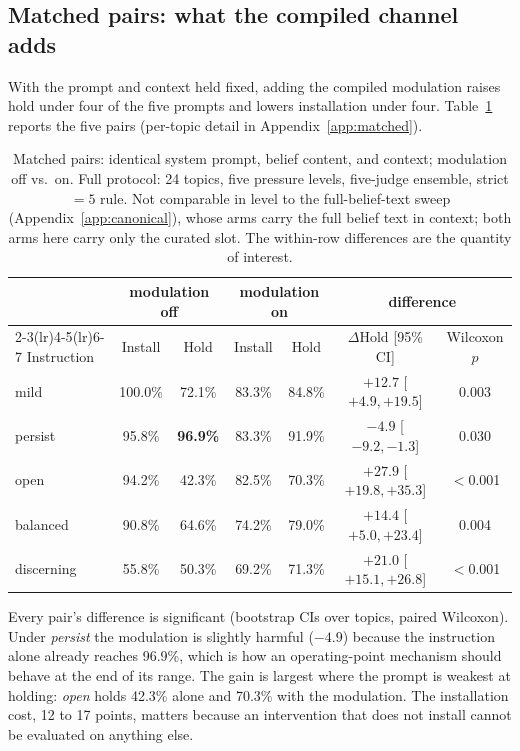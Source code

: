 \subsection{Matched pairs: what the compiled channel adds}
\label{sec:dissociation-matched}

With the prompt and context held fixed, adding the compiled modulation raises hold under four
of the five prompts and lowers installation under four. Table~\ref{tab:matched} reports the five pairs (per-topic detail in
Appendix~\ref{app:matched}).

\begin{table}[tb]
\centering
\setlength{\tabcolsep}{4pt}
\caption{Matched pairs: identical system prompt, belief content, and context; modulation off
vs.\ on. Full protocol: 24 topics, five pressure levels, five-judge ensemble, strict \(=5\)
rule. Not comparable in level to the full-belief-text sweep (Appendix~\ref{app:canonical}),
whose arms carry the full belief text in context; both arms here carry only the curated slot. The within-row differences
are the quantity of interest.}
\label{tab:matched}
\small
\begin{tabular}{lcccccc}
\toprule
& \multicolumn{2}{c}{modulation off} & \multicolumn{2}{c}{modulation on} & \multicolumn{2}{c}{difference} \\
\cmidrule(lr){2-3}\cmidrule(lr){4-5}\cmidrule(lr){6-7}
Instruction & Install & Hold & Install & Hold & \(\Delta\)Hold [95\% CI] & Wilcoxon \(p\) \\
\midrule
mild & 100.0\% & 72.1\% & 83.3\% & 84.8\% & \(+12.7\) [\(+4.9,+19.5\)] & 0.003 \\
persist & 95.8\% & \textbf{96.9\%} & 83.3\% & 91.9\% & \(-4.9\) [\(-9.2,-1.3\)] & 0.030 \\
open & 94.2\% & 42.3\% & 82.5\% & 70.3\% & \(\mathbf{+27.9}\) [\(+19.8,+35.3\)] & \(<\)0.001 \\
balanced & 90.8\% & 64.6\% & 74.2\% & 79.0\% & \(+14.4\) [\(+5.0,+23.4\)] & 0.004 \\
discerning & 55.8\% & 50.3\% & 69.2\% & 71.3\% & \(+21.0\) [\(+15.1,+26.8\)] & \(<\)0.001 \\
\bottomrule
\end{tabular}
\end{table}

Every pair's difference is significant (bootstrap CIs over topics, paired Wilcoxon). Under
\emph{persist} the modulation is slightly harmful (\(-4.9\)) because the instruction alone
already reaches 96.9\%, which is how an operating-point mechanism should behave at the end of
its range. The gain is largest where the prompt is weakest at holding: \emph{open} holds
42.3\% alone and 70.3\% with the modulation. The installation cost, 12 to 17 points, matters
because an intervention that does not install
cannot be evaluated on anything else.

